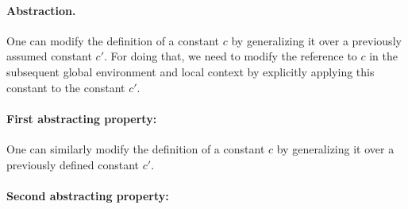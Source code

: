 



\paragraph{Abstraction.}

One can modify the definition of a constant $c$ by generalizing it
over a previously assumed constant $c'$. For doing that, we need
to modify the reference to $c$ in the subsequent global environment
and local context by explicitly applying this constant to the constant $c'$.

\paragraph{First abstracting property:}

One can similarly modify the definition of a constant $c$ by generalizing it
over a previously defined constant $c'$.

\paragraph{Second abstracting property:}

